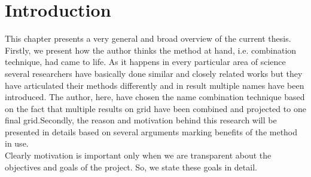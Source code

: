 \chapter{Introduction}
\label{chapter:Introduction}

This chapter presents a very general and broad overview of the current thesis. Firstly, we present how the author thinks the method at hand, i.e. combination technique, had came to life. As it happens in every particular area of science several researchers have basically done similar and closely related works but they have articulated their methods differently and in result multiple names have been introduced. The author, here, have chosen the name combination technique based on the fact that multiple results on grid have been combined and projected to one final grid.Secondly, the reason and motivation behind this research will be presented in details based on several arguments marking benefits of the method in use.\\
Clearly motivation is important only when we are transparent about the objectives and goals of the project. So, we state these goals in detail.\\